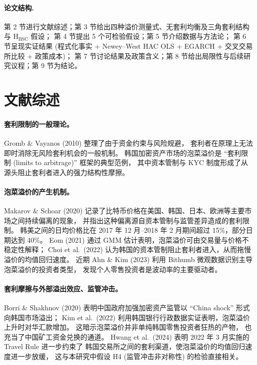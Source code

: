 \documentclass[11pt,a4paper]{article}
\begin{document}
\paragraph{论文结构.}
第 2 节进行文献综述；第 3 节给出四种溢价测量式、无套利均衡及三角套利结构与 $\mathrm{H_{BSC}}$ 假设；
第 4 节提出 5 个可检验假设；第 5 节介绍数据与方法论；
第 6 节呈现实证结果 (程式化事实 + Newey--West HAC OLS + EGARCH + 交叉交易所比较 + 政策成本)；
第 7 节讨论结果及政策含义；第 8 节给出局限性与后续研究议程；第 9 节为结论。

\section{文献综述}

\paragraph{套利限制的一般理论。}
Gromb \& Vayanos (2010) 整理了由于资金约束与风险规避，
套利者在原理上无法即时消除无风险套利机会的一般机制。
韩国加密资产市场的泡菜溢价是 ``套利限制 (limits to arbitrage)'' 框架的典型范例，
其中资本管制与 KYC 制度形成了从源头阻止套利者进入的强力结构性摩擦。

\paragraph{泡菜溢价的产生机制。}
Makarov \& Schoar (2020) 记录了比特币价格在美国、韩国、日本、欧洲等主要市场之间持续偏离的现象，
并指出这种偏离源自资本管制与监管差异造成的套利限制。
韩美之间的日均价格比在 2017 年 12 月--2018 年 2 月期间超过 15\%，部分日期达到 40\%。
Eom (2021) 通过 GMM 估计表明，泡菜溢价可由交易量与价格不稳定性解释；
Choi et al.\ (2022) 认为韩国的资本管制阻止套利者进入，从而拖慢溢价的均值回归速度。
近期 Ahn \& Kim (2023) 利用 Bithumb 微观数据识别主导泡菜溢价的投资者类型，
发现个人零售投资者是波动率的主要驱动者。

\paragraph{套利摩擦与外部溢出效应、监管冲击。}
Borri \& Shakhnov (2020) 表明中国政府加强加密资产监管以 ``China shock'' 形式向韩国市场溢出；
Kim et al.\ (2022) 利用韩国银行行政数据实证表明，泡菜溢价上升时对华汇款增加。
这暗示泡菜溢价并非单纯韩国零售投资者狂热的产物，
也充当了中国矿工资金兑换的通道。
Hwang et al.\ (2024) 表明 2022 年 3 月实施的 Travel Rule 进一步约束了
韩国交易所之间的套利渠道，使泡菜溢价的均值回归速度进一步放缓，
这与本研究中假设 H4 (监管冲击非对称性) 的检验直接相关。
\end{document}

